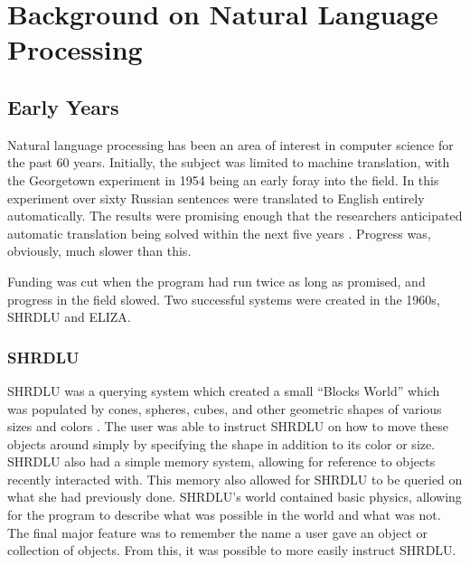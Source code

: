 \chapter{Background on Natural Language Processing}\label{text}                                                                   
\section{Early Years}

Natural language processing has been an area of interest in computer science for the past 60 years. Initially, the subject was limited to machine translation, with the Georgetown experiment in 1954 being an early foray into the field. In this experiment over sixty Russian sentences were translated to English entirely automatically. The results were promising enough that the researchers anticipated automatic translation being solved within the next five years \cite{Hutchins}. Progress was, obviously, much slower than this.             

 
Funding was cut when the program had run twice as long as promised, and progress in the field slowed. Two successful systems were created in the 1960s, SHRDLU and ELIZA.
                                                                                          
\subsection{SHRDLU}                                                                    
SHRDLU was a querying system which created a small ``Blocks World'' which was populated by cones, spheres, cubes, and other geometric shapes of various sizes and colors \cite{winograd}. The user was able to instruct SHRDLU on how to move these objects around simply by specifying the shape in addition to its color or size. SHRDLU also had a simple memory system, allowing for reference to objects recently interacted with. This memory also allowed for SHRDLU to be queried on what she had previously done. SHRDLU's world contained basic physics, allowing for the program to describe what was possible in the world and what was not. The final major feature was to remember the name a user gave an object or collection of objects. From this, it was possible to more easily instruct SHRDLU.                      
                                                                                          
